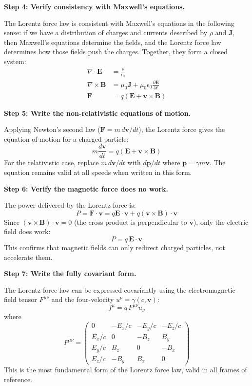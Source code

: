 \textbf{Step 4: Verify consistency with Maxwell's equations.}

The Lorentz force law is consistent with Maxwell's equations in the following sense: if we have a distribution of charges and currents described by $\rho$ and $\mathbf{J}$, then Maxwell's equations determine the fields, and the Lorentz force law determines how those fields push the charges. Together, they form a closed system:
\begin{align}
\nabla\cdot\mathbf{E} &= \frac{\rho}{\epsilon_0} \\
\nabla\times\mathbf{B} &= \mu_0\mathbf{J} + \mu_0\epsilon_0\frac{\partial\mathbf{E}}{\partial t} \\
\mathbf{F} &= q(\mathbf{E} + \mathbf{v}\times\mathbf{B})
\end{align}

\textbf{Step 5: Write the non-relativistic equations of motion.}

Applying Newton's second law ($\mathbf{F} = m\,d\mathbf{v}/dt$), the Lorentz force gives the equation of motion for a charged particle:
\begin{equation}
m\frac{d\mathbf{v}}{dt} = q(\mathbf{E} + \mathbf{v}\times\mathbf{B})
\end{equation}
For the relativistic case, replace $m\,d\mathbf{v}/dt$ with $d\mathbf{p}/dt$ where $\mathbf{p} = \gamma m\mathbf{v}$. The equation remains valid at all speeds when written in this form.

\textbf{Step 6: Verify the magnetic force does no work.}

The power delivered by the Lorentz force is:
\begin{equation}
P = \mathbf{F}\cdot\mathbf{v} = q\mathbf{E}\cdot\mathbf{v} + q(\mathbf{v}\times\mathbf{B})\cdot\mathbf{v}
\end{equation}
Since $(\mathbf{v}\times\mathbf{B})\cdot\mathbf{v} = 0$ (the cross product is perpendicular to $\mathbf{v}$), only the electric field does work:
\begin{equation}
P = q\,\mathbf{E}\cdot\mathbf{v}
\end{equation}
This confirms that magnetic fields can only redirect charged particles, not accelerate them.

\textbf{Step 7: Write the fully covariant form.}

The Lorentz force law can be expressed covariantly using the electromagnetic field tensor $F^{\mu\nu}$ and the four-velocity $u^\nu = \gamma(c,\mathbf{v})$:
\begin{equation}
f^\mu = q\,F^{\mu\nu}u_\nu
\end{equation}
where
\begin{equation}
F^{\mu\nu} = \begin{pmatrix} 0 & -E_x/c & -E_y/c & -E_z/c \\ E_x/c & 0 & -B_z & B_y \\ E_y/c & B_z & 0 & -B_x \\ E_z/c & -B_y & B_x & 0 \end{pmatrix}
\end{equation}
This is the most fundamental form of the Lorentz force law, valid in all frames of reference.

